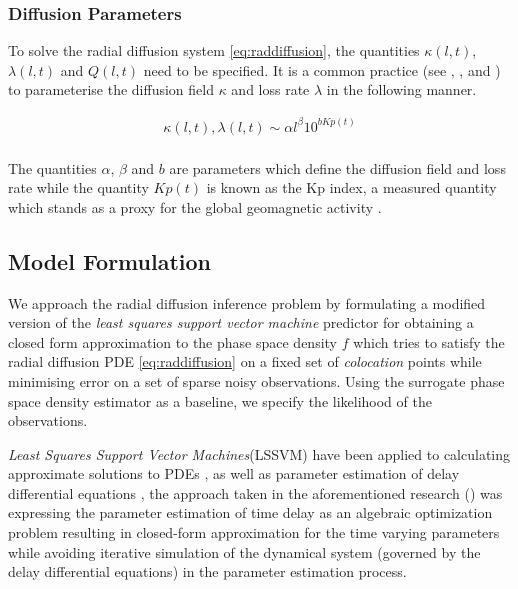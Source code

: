 \documentclass{article}
\begin{document}
\subsubsection*{Diffusion Parameters}

To solve the radial diffusion system \ref{eq:raddiffusion}, the
quantities $\kappa(l, t)$, $\lambda(l, t)$ and $Q(l, t)$ need to be
specified. It is a common practice (see \citet{GRL:GRL10762},
\citet{JGRA:JGRA15067}, \citet{JGRA:JGRA18021} and
\citet{GRL:GRL22815}) to parameterise the diffusion field
$\kappa$ and loss rate $\lambda$ in the following manner.

\begin{align}
  \kappa(l,t), \lambda(l, t) \sim \alpha l^{\beta} 10^{b Kp(t)} \\
\end{align}

The quantities $\alpha$, $\beta$ and $b$ are parameters which define
the diffusion field and loss rate while the quantity $Kp(t)$ is known
as the Kp index, a measured quantity which stands as a proxy for the
global geomagnetic activity \cite{BartelsKp}.

\subsection{Model Formulation}

We approach the radial diffusion inference problem by formulating a
modified version of the \emph{least squares support vector machine}
predictor for obtaining a closed form approximation to the phase space
density $f$ which tries to satisfy the radial diffusion PDE
\ref{eq:raddiffusion} on a fixed set of \emph{colocation} points while
minimising error on a set of sparse noisy observations. 
Using the surrogate phase space density estimator as a baseline, we
specify the likelihood of the observations.

\emph{Least Squares Support Vector Machines}(LSSVM) have been applied
to calculating approximate solutions to PDEs
\citep{MEHRKANOON2015105}, \citep{MEHRKANOON20122502} as well as
parameter estimation of delay differential equations
\citep{MEHRKANOON2014830}, the approach taken in the aforementioned
research (\citet{MEHRKANOON2014830}) was expressing the parameter
estimation of time delay as an algebraic optimization problem
resulting in closed-form approximation for the time varying parameters
while avoiding iterative simulation of the dynamical system (governed
by the delay differential equations) in the parameter estimation process.
\end{document}
